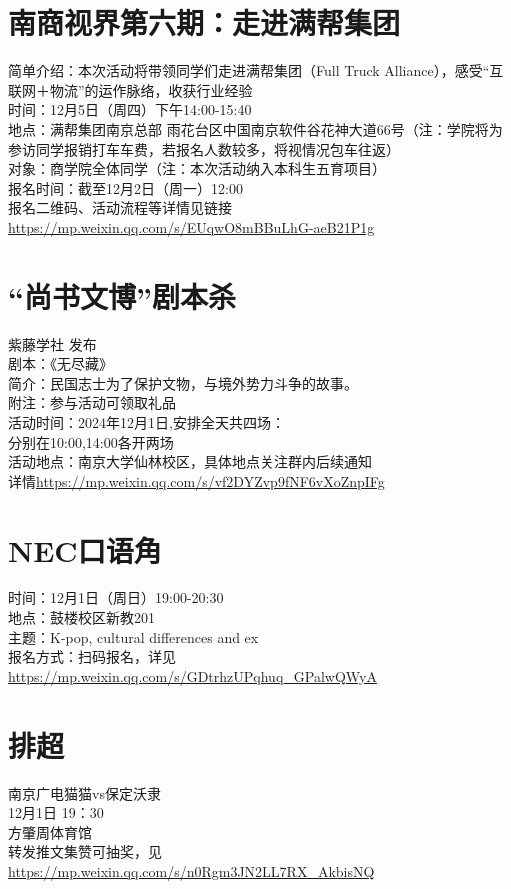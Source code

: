 \documentclass[letterpaper, 12pt]{article}
\begin{document}
\begin{multicols}{2}
\section{南商视界第六期：走进满帮集团}
简单介绍：本次活动将带领同学们走进满帮集团（Full Truck Alliance），感受“互联网＋物流”的运作脉络，收获行业经验\\时间：12月5日（周四）下午14:00-15:40\\地点：满帮集团南京总部 雨花台区中国南京软件谷花神大道66号（注：学院将为参访同学报销打车车费，若报名人数较多，将视情况包车往返）\\对象：商学院全体同学（注：本次活动纳入本科生五育项目）\\报名时间：截至12月2日（周一）12:00\\报名二维码、活动流程等详情见链接\url{https://mp.weixin.qq.com/s/EUqwO8mBBuLhG-aeB21P1g}\\

\section{“尚书文博”剧本杀}
紫藤学社 发布\\
剧本：《无尽藏》\\
简介：民国志士为了保护文物，与境外势力斗争的故事。\\
附注：参与活动可领取礼品\\
活动时间：2024年12月1日,安排全天共四场：\\
分别在10:00,14:00各开两场\\
活动地点：南京大学仙林校区，具体地点关注群内后续通知\\
详情\url{https://mp.weixin.qq.com/s/vf2DYZvp9fNF6vXoZnpIFg}\\

\section{NEC口语角}
时间：12月1日（周日）19:00-20:30\\
地点：鼓楼校区新教201\\
主题：K-pop, cultural differences and ex\\
报名方式：扫码报名，详见\url{https://mp.weixin.qq.com/s/GDtrhzUPqhuq_GPalwQWyA}

\section{排超}
南京广电猫猫vs保定沃隶\\
12月1日 19：30\\
方肇周体育馆\\
转发推文集赞可抽奖，见\url{https://mp.weixin.qq.com/s/n0Rgm3JN2LL7RX_AkbisNQ}

\end{multicols}
\end{document}
